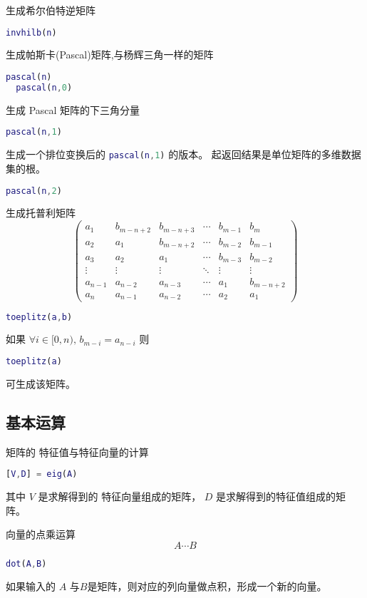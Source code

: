 \documentclass{ctexart}
\begin{document}
  生成希尔伯特逆矩阵
  \begin{lstlisting}[language=matlab]
  invhilb(n)
  \end{lstlisting}

  生成帕斯卡(Pascal)矩阵,与杨辉三角一样的矩阵
  \begin{lstlisting}[language=matlab]
  pascal(n)
  pascal(n,0)
  \end{lstlisting}
  生成 Pascal 矩阵的下三角分量
  \begin{lstlisting}[language=matlab]
  pascal(n,1)
  \end{lstlisting}
  生成一个排位变换后的 \lstinline[language=matlab]|pascal(n,1)| 的版本。
  起返回结果是单位矩阵的多维数据集的根。
  \begin{lstlisting}[language=matlab]
  pascal(n,2)
  \end{lstlisting}

  生成托普利矩阵
  $$\left(\begin{array}{cccccc}
  a_1     & b_{m-n+2} & b_{m-n+3} & \cdots & b_{m-1} & b_m \\
  a_2     & a_1     & b_{m-n+2} & \cdots & b_{m-2} & b_{m-1}\\
  a_3     & a_2     & a_1     & \cdots & b_{m-3} & b_{m-2}\\
  \vdots  & \vdots  & \vdots  & \ddots & \vdots  & \vdots \\
  a_{n-1} & a_{n-2} & a_{n-3} & \cdots & a_1     & b_{m-n+2} \\
  a_n     & a_{n-1} & a_{n-2} & \cdots & a_2     & a_1
  \end{array}\right)$$
  \begin{lstlisting}[language=matlab]
  toeplitz(a,b)
  \end{lstlisting}
  如果 $\forall i \in [0,n) ,\, b_{m-i}=a_{n-i}$
  则
  \begin{lstlisting}[language=matlab]
  toeplitz(a)
  \end{lstlisting}
  可生成该矩阵。

  \subsection{基本运算}
  \label{ssec:mat:bc}

  矩阵的 特征值与特征向量的计算
  \begin{lstlisting}[language=matlab]
  [V,D] = eig(A)
  \end{lstlisting}
  其中 $V$ 是求解得到的 特征向量组成的矩阵， $D$ 是求解得到的特征值组成的矩阵。

  向量的点乘运算
  $$A\cdots B$$
  \begin{lstlisting}[language=matlab]
  dot(A,B)
  \end{lstlisting}
  如果输入的 $A$ 与$B$是矩阵，则对应的列向量做点积，形成一个新的向量。
\end{document}
